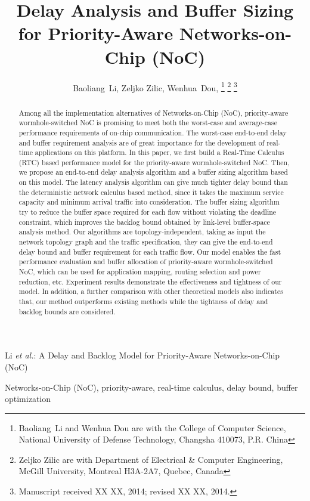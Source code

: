 \documentclass[10pt,journal]{IEEEtran}
\begin{document}
\title{Delay Analysis and Buffer Sizing for Priority-Aware Networks-on-Chip (NoC)}

\author{Baoliang~Li, %
        Zeljko Zilic, %
        Wenhua~Dou, %
\thanks{Baoliang~Li and Wenhua Dou are with the College of Computer Science, National University of Defense Technology, Changsha 410073, P.R. China}%
\thanks{Zeljko Zilic are with Department of Electrical \& Computer Engineering, McGill University, Montreal H3A-2A7, Quebec, Canada}%
\thanks{Manuscript received XX XX, 2014; revised XX XX, 2014.}}

%
{Li \MakeLowercase{\textit{et al.}}: A Delay and Backlog Model for Priority-Aware Networks-on-Chip (NoC)}

\maketitle

\begin{abstract}
Among all the implementation alternatives of Networks-on-Chip (NoC), priority-aware wormhole-switched NoC is promising to meet both the worst-case and average-case performance requirements of on-chip communication. The worst-case end-to-end delay and buffer requirement analysis are of great importance for the development of real-time applications on this platform. In this paper, we first build a Real-Time Calculus (RTC) based performance model for the priority-aware wormhole-switched NoC. Then, we propose an end-to-end delay analysis algorithm and a buffer sizing algorithm based on this model. The latency analysis algorithm can give much tighter delay bound than the deterministic network calculus based method, since it takes the maximum service capacity and minimum arrival traffic into consideration. The buffer sizing algorithm try to reduce the buffer space required for each flow without violating the deadline constraint, which improves the backlog bound obtained by link-level buffer-space analysis method. Our algorithms are topology-independent, taking as input the network topology graph and the traffic specification, they can give the end-to-end delay bound and buffer requirement for each traffic flow. Our model enables the fast performance evaluation and buffer allocation of priority-aware wormhole-switched NoC, which can be used for application mapping, routing selection and power reduction, etc. Experiment results demonstrate the effectiveness and tightness of our model. In addition, a further comparison with other theoretical models also indicates that, our method outperforms existing methods while the tightness of delay and backlog bounds are considered.
\end{abstract}
\begin{IEEEkeywords}
Networks-on-Chip (NoC), priority-aware, real-time calculus, delay bound, buffer optimization
\end{IEEEkeywords}
\end{document}
